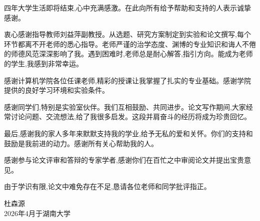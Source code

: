 \begin{newThanks}
四年大学生活即将结束,心中充满感激。在此向所有给予帮助和支持的人表示诚挚感谢。

衷心感谢指导教师刘益萍副教授。从选题、研究方案制定到实验和论文撰写,每个环节都离不开老师的悉心指导。老师严谨的治学态度、渊博的专业知识和诲人不倦的师德风范深深影响了我。遇到困难时,老师总是耐心解答,指引方向。能成为老师的学生,我感到非常幸运。

感谢计算机学院各位任课老师,精彩的授课让我掌握了扎实的专业基础。感谢学院提供的良好学习环境和实验条件。

感谢同学们,特别是实验室伙伴。我们互相鼓励、共同进步。论文写作期间,大家经常讨论问题、交流想法,给了我很多启发。这段并肩奋斗的经历将成为珍贵回忆。

最后,感谢我的家人多年来默默支持我的学业,给予无私的爱和关怀。你们的支持和鼓励是我前进的动力。感谢所有关心帮助我的人。

感谢参与论文评审和答辩的专家学者,感谢你们在百忙之中审阅论文并提出宝贵意见。

由于学识有限,论文中难免存在不足,恳请各位老师和同学批评指正。

\vspace{2cm}

\begin{flushright}
杜森源\\
2026年4月于湖南大学
\end{flushright}

\end{newThanks}
